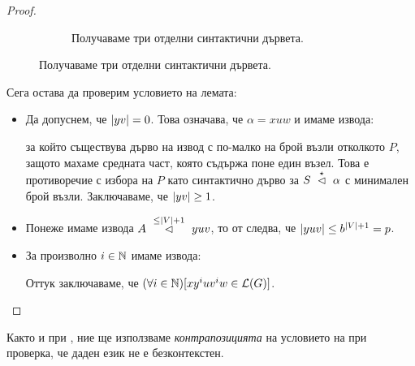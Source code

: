 \begin{proof}
\begin{figure}[H]
\begin{subfigure}[t]{0.3\textwidth}
      \caption{\scriptsize{Получаваме три отделни синтактични дървета.}}
    \end{subfigure}
  \end{figure}
  Сега остава да проверим условието на лемата:
  \begin{itemize}
  \item
    Да допуснем, че $\abs{yv} = 0$. Това означава, че $\alpha = xuw$ и имаме извода:
    \begin{prooftree}
    \end{prooftree}
    за който съществува дърво на извод с по-малко на брой възли отколкото $P$, защото махаме средната част, която съдържа поне един възел.
    Това е противоречие с избора на $P$ като синтактично дърво за $S \yield{\star}\alpha$ с минимален брой възли.
    Заключаваме, че $\abs{yv} \geq 1$.
  \item
    Понеже имаме извода $A \yield{\leq\abs{V}+1} yuv$, то от  следва, че $\abs{yuv} \leq b^{\abs{V}+1} = p$.
  \item
    За произволно $i\in\Nat$ имаме извода:
    \begin{prooftree}
    \end{prooftree}
    Оттук заключаваме, че $(\forall i \in \Nat)[xy^iuv^iw \in \L(G)]$.
  \end{itemize}
\end{proof}

Както и при , ние ще използваме \emph{контрапозицията} на условието на 
при проверка, че даден език не е безконтекстен.


